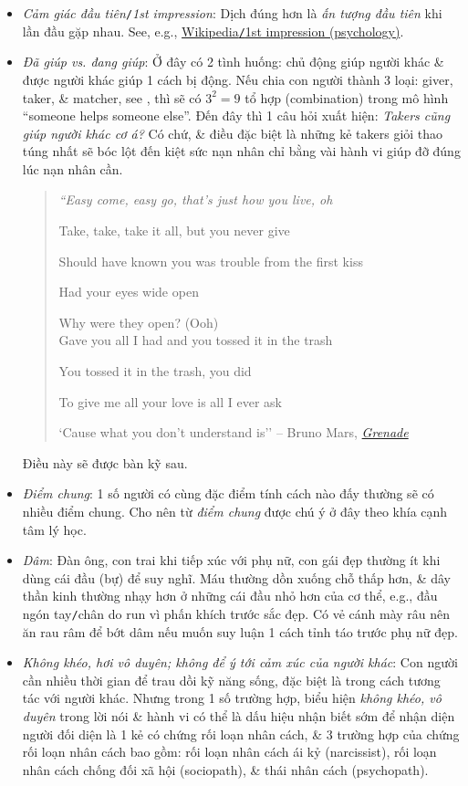 \documentclass[12pt,twoside]{book}
\begin{document}
\begin{itemize}
	\item {\it Cảm giác đầu tiên}{\tt/}{\it 1st impression}: Dịch đúng hơn là {\it ấn tượng đầu tiên} khi lần đầu gặp nhau. See, e.g., \href{https://en.wikipedia.org/wiki/First_impression_(psychology)}{Wikipedia{\tt/}1st impression (psychology)}.
	\item {\it Đã giúp {\tt <người nào đó>} vs. {\tt <người nào đó>} đang giúp}: Ở đây có 2 tình huống: chủ động giúp người khác \& được người khác giúp 1 cách bị động. Nếu chia con người thành 3 loại: giver, taker, \& matcher, see \cite{Grant_give_take,Grant_give_take_VN}, thì sẽ có $3^2 = 9$ tổ hợp (combination) trong mô hình ``someone helps someone else''. Đến đây thì 1 câu hỏi xuất hiện: {\it Takers cũng giúp người khác cơ á?} Có chứ, \& điều đặc biệt là những kẻ takers giỏi thao túng nhất sẽ bóc lột đến kiệt sức nạn nhân chỉ bằng vài hành vi giúp đỡ đúng lúc nạn nhân cần.
	\begin{quote}\it
		``Easy come, easy go, that's just how you live, oh
		
		Take, take, take it all, but you never give
		
		Should have known you was trouble from the first kiss
		
		Had your eyes wide open
		
		Why were they open? (Ooh)\\
		
		Gave you all I had and you tossed it in the trash
		
		You tossed it in the trash, you did
		
		To give me all your love is all I ever ask
		
		`Cause what you don't understand is'' -- {\sc Bruno Mars}, \href{https://www.youtube.com/watch?v=SR6iYWJxHqs}{{\it Grenade}}
	\end{quote}
	Điều này sẽ được bàn kỹ sau.
	\item {\it Điểm chung}: 1 số người có cùng đặc điểm tính cách nào đấy thường sẽ có nhiều điểm chung. Cho nên từ {\it điểm chung} được chú ý ở đây theo khía cạnh tâm lý học.
	\item {\it Dâm}: Đàn ông, con trai khi tiếp xúc với phụ nữ, con gái đẹp thường ít khi dùng cái đầu (bự) để suy nghĩ. Máu thường dồn xuống chỗ thấp hơn, \& dây thần kinh thường nhạy hơn ở những cái đầu nhỏ hơn của cơ thể, e.g., đầu ngón tay{\tt/}chân do run vì phấn khích trước sắc đẹp. Có vẻ cánh mày râu nên ăn rau râm để bớt dâm nếu muốn suy luận 1 cách tỉnh táo trước phụ nữ đẹp.
	\item {\it Không khéo, hơi vô duyên; không để ý tới cảm xúc của người khác}: Con người cần nhiều thời gian để trau dồi kỹ năng sống, đặc biệt là trong cách tương tác với người khác. Nhưng trong 1 số trường hợp, biểu hiện {\it không khéo, vô duyên} trong lời nói \& hành vi có thể là dấu hiệu nhận biết sớm để nhận diện người đối diện là 1 kẻ có chứng rối loạn nhân cách, \& 3 trường hợp của chứng rối loạn nhân cách bao gồm: rối loạn nhân cách ái kỷ (narcissist), rối loạn nhân cách chống đối xã hội (sociopath), \& thái nhân cách (psychopath).
\end{itemize} 
\end{document}
